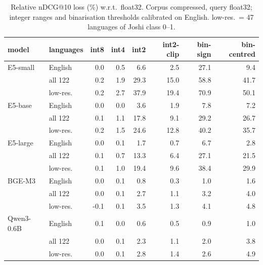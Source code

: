 \begin{table}[t]\centering\footnotesize
\begin{tabular}{llrrrrrr}
\toprule
model & languages & int8 & int4 & int2 & int2-clip & bin-sign & bin-centred \\
\midrule
E5-small & English & 0.0 & 0.5 & 6.6 & 2.5 & 27.1 & 9.4 \\
 & all 122 & 0.2 & 1.9 & 29.3 & 15.0 & 58.8 & 41.7 \\
 & low-res. & 0.2 & 2.7 & 37.9 & 19.4 & 70.9 & 50.1 \\
E5-base & English & 0.0 & 0.0 & 3.6 & 1.9 & 7.8 & 7.2 \\
 & all 122 & 0.1 & 1.1 & 17.8 & 9.1 & 29.2 & 26.7 \\
 & low-res. & 0.2 & 1.5 & 24.6 & 12.8 & 40.2 & 35.7 \\
E5-large & English & 0.0 & 0.1 & 1.7 & 0.7 & 6.7 & 2.8 \\
 & all 122 & 0.1 & 0.7 & 13.3 & 6.4 & 27.1 & 21.5 \\
 & low-res. & 0.1 & 1.0 & 19.4 & 9.6 & 38.4 & 29.9 \\
BGE-M3 & English & 0.0 & 0.1 & 0.8 & 0.3 & 1.0 & 1.6 \\
 & all 122 & 0.0 & 0.1 & 2.7 & 1.1 & 3.2 & 4.0 \\
 & low-res. & -0.1 & 0.1 & 3.5 & 1.3 & 4.1 & 4.8 \\
Qwen3-0.6B & English & 0.1 & 0.0 & 0.6 & 0.5 & 0.9 & 1.0 \\
 & all 122 & 0.0 & 0.1 & 2.3 & 1.1 & 2.0 & 3.8 \\
 & low-res. & 0.0 & 0.1 & 2.8 & 1.4 & 2.6 & 4.9 \\
\bottomrule
\end{tabular}
\caption{Relative nDCG@10 loss (\%) w.r.t.\ float32. Corpus compressed, query float32; integer ranges and binarisation thresholds calibrated on English. low-res.\ = 47 languages of Joshi class 0--1.}\label{tab:drop}
\end{table}